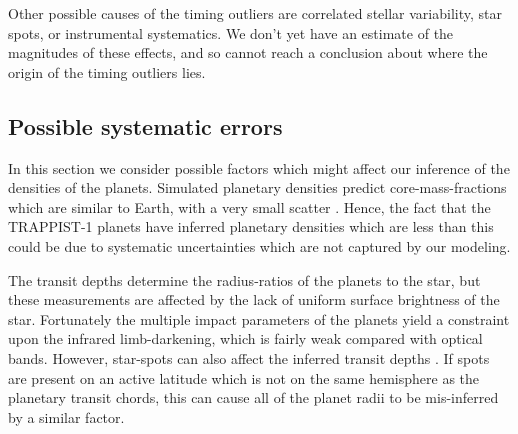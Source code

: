 \documentclass[fleqn,usenatbib]{mnras} %
\begin{document}
Other possible causes of the timing outliers are correlated stellar variability, star spots, or instrumental systematics.  We don't yet have an estimate of the magnitudes of these effects, and so cannot reach a conclusion about where the origin of the timing outliers lies.





\subsection{Possible systematic errors}

In this section we consider possible factors which might affect our
inference of the densities of the planets.  Simulated planetary
densities predict core-mass-fractions which are similar to 
Earth, with a very small scatter \citep{Scora2020}.  Hence, the
fact that the TRAPPIST-1 planets have inferred planetary densities
which are less than this could be due to systematic uncertainties
which are not captured by our modeling.

The transit depths
determine the radius-ratios of the planets to the star, but these
measurements are affected by the lack of uniform surface brightness
of the star.  Fortunately the multiple impact parameters of the
planets yield a constraint upon the infrared limb-darkening, which
is fairly weak compared with optical bands.  However, star-spots
can also affect the inferred transit depths \citep{Rackham2018,
Kipping2012b}.  If spots are present on an active latitude
which is not on the same hemisphere as the planetary transit chords,
this can cause all of the planet radii to be mis-inferred by a similar
factor.
\end{document}
